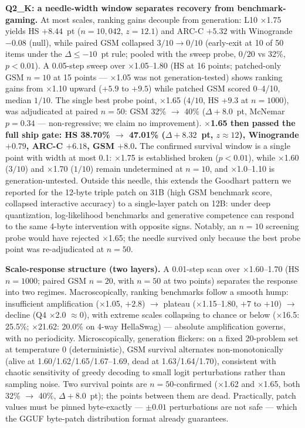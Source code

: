 \documentclass[11pt]{article}
\begin{document}
\textbf{Q2\_K: a needle-width window separates recovery from
benchmark-gaming.} At most scales, ranking gains decouple from
generation: L10 $\times$1.75 yields HS $+8.44$~pt ($n{=}10{,}042$,
$z{=}12.1$) and ARC-C $+5.32$ with Winogrande $-0.08$ (null), while
paired GSM collapsed $3/10 \to 0/10$ (early-exit at 10 of 50 items under
the $\Delta \leq -10$~pt rule; pooled with the sweep probe, $0/20$ vs
32\%, $p{<}0.01$). A 0.05-step sweep over $\times$1.05--1.80 (HS at 16
points; patched-only GSM $n{=}10$ at 15 points --- $\times$1.05 was not
generation-tested) shows ranking gains from $\times$1.10 upward ($+5.9$
to $+9.5$) while patched GSM scored 0--4/10, median $1/10$. The single
best probe point, $\times$1.65 ($4/10$, HS $+9.3$ at $n{=}1000$), was
adjudicated at paired $n{=}50$: GSM 32\% $\to$ 40\% ($\Delta{+}8.0$~pt,
McNemar $p{=}0.34$ --- non-regressive; we claim no improvement).
\textbf{$\times$1.65 then passed the full ship gate: HS 38.70\% $\to$
47.01\% ($\Delta{+}8.32$~pt, $z{\approx}12$), Winogrande $+0.79$, ARC-C
$+6.18$, GSM $+8.0$.} The confirmed survival window is a single point
with width at most 0.1: $\times$1.75 is established broken ($p{<}0.01$),
while $\times$1.60 ($3/10$) and $\times$1.70 ($1/10$) remain undetermined
at $n{=}10$, and $\times$1.0--1.10 is generation-untested. Outside this
needle, this extends the Goodhart pattern we reported for the 12-byte
triple patch on 31B (high GSM benchmark score, collapsed interactive
accuracy) to a single-layer patch on 12B: under deep quantization,
log-likelihood benchmarks and generative competence can respond to the
same 4-byte intervention with opposite signs.
Notably, an $n{=}10$ screening probe would have rejected $\times$1.65;
the needle survived only because the best probe point was re-adjudicated
at $n{=}50$.

\textbf{Scale-response structure (two layers).} A 0.01-step scan over
$\times$1.60--1.70 (HS $n{=}1000$; paired GSM $n{=}20$, with $n{=}50$ at
two points) separates the response into two regimes. Macroscopically,
ranking benchmarks follow a smooth hump: insufficient amplification
($\times$1.05, $+2.8$) $\to$ plateau ($\times$1.15--1.80, $+7$ to $+10$)
$\to$ decline (Q4 $\times$2.0 $\approx 0$), with extreme scales
collapsing to chance or below ($\times$16.5: 25.5\%; $\times$21.62:
20.0\% on 4-way HellaSwag) --- absolute amplification governs, with no
periodicity. Microscopically, generation flickers: on a fixed 20-problem
set at temperature 0 (deterministic), GSM survival alternates
non-monotonically (alive at 1.60/1.62/1.65/1.67--1.69, dead at
1.63/1.64/1.70), consistent with chaotic sensitivity of greedy decoding
to small logit perturbations rather than sampling noise. Two survival
points are $n{=}50$-confirmed ($\times$1.62 and $\times$1.65, both
32\% $\to$ 40\%, $\Delta{+}8.0$~pt); the points between them are dead.
Practically, patch values must be pinned byte-exactly --- $\pm 0.01$
perturbations are not safe --- which the GGUF byte-patch distribution
format already guarantees.
\end{document}
